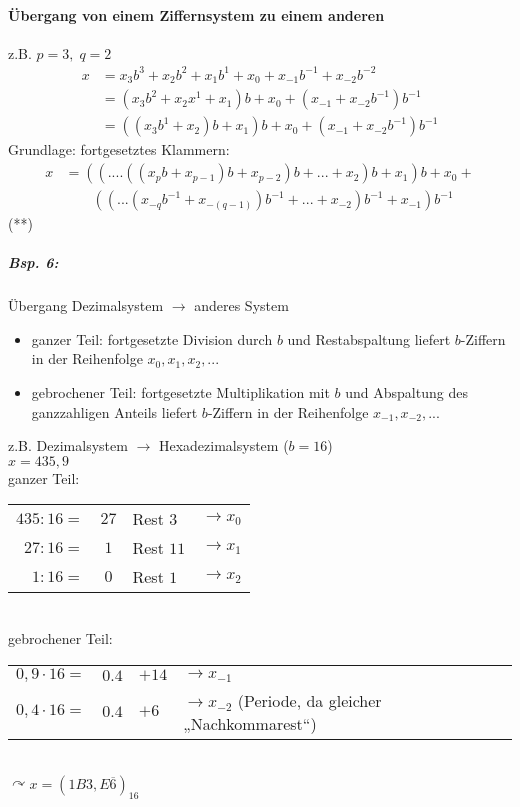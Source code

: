 \paragraph{Übergang von einem Ziffernsystem zu einem anderen}\parskp
z.B. $p=3,\; q=2$
\begin{align*}
x&=x_3b^3+x_2b^2+x_1b^1+x_0+x_{-1}b^{-1}+x_{-2}b^{-2}\\
&= (x_3b^2+x_2x^1+x_1)b+x_0+(x_{-1}+x_{-2}b^{-1})b^{-1}\\
&=((x_3b^1+x_2)b+x_1)b+x_0+(x_{-1}+x_{-2}b^{-1})b^{-1}
\end{align*}
Grundlage: fortgesetztes Klammern:
\begin{align*}
x&=((....((x_p b+x_{p-1})b+x_{p-2})b+...+x_2)b+x_1)b+x_0+\\
&\qquad((...(x_{-q}b^{-1}+x_{-(q-1)})b^{-1}+...+x_{-2})b^{-1}+x_{-1})b^{-1}
\end{align*} (**)
\subparagraph{Bsp. 6:} Übergang Dezimalsystem $\rightarrow$ anderes System
\begin{itemize}
\item ganzer Teil: fortgesetzte Division durch $b$ und Restabspaltung liefert $b$-Ziffern in der Reihenfolge $x_0,x_1,x_2,...$
\item gebrochener Teil: fortgesetzte Multiplikation mit $b$ und Abspaltung des ganzzahligen Anteils liefert $b$-Ziffern in der Reihenfolge $x_{-1},x_{-2},...$
\end{itemize}
z.B. Dezimalsystem $\rightarrow$ Hexadezimalsystem ($b=16$)\\
$x=435,9$\\
ganzer Teil:\\
\begin{tabular}{r c l l}
$435:16=$ & $27$ & Rest $3$ &  $\rightarrow x_0$\\
$27:16=$ & $1$ & Rest $11$ &  $\rightarrow x_1$\\
$1:16=$ & $\boxed{0}$ & Rest $1$ &  $\rightarrow x_2$\\
\end{tabular}\\
gebrochener Teil: \\
\begin{tabular}{r c l l}
$0,9 \cdot 16=$ & $0.4$ & $+14$ & $\rightarrow x_{-1}$\\
$0,4 \cdot 16=$ & $\boxed{0.4}$ & $+6$ & $\rightarrow x_{-2}$ (Periode, da gleicher „Nachkommarest“)\\
\end{tabular}\\
$\curvearrowright x=(1B3,E\overline{6})_{16}$

